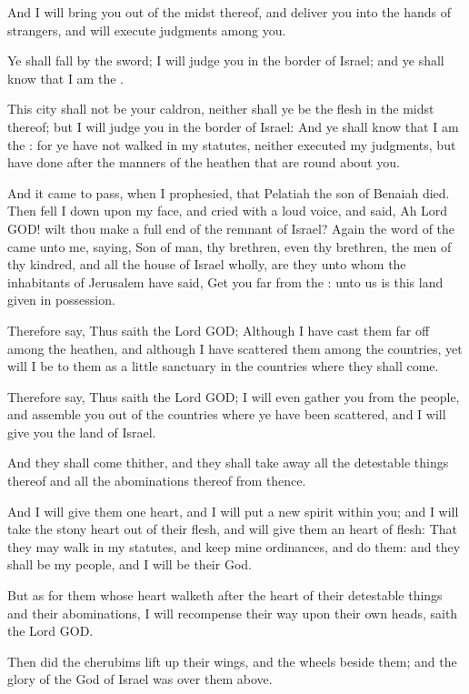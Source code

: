 \Verse And I will bring you out of the midst thereof, and deliver you into the hands of strangers, and will execute judgments among you.

\Verse Ye shall fall by the sword; I will judge you in the border of Israel; and ye shall know that I am the \LORD.

\Verse This city shall not be your caldron, neither shall ye be the flesh in the midst thereof; but I will judge you in the border of Israel: \Verse And ye shall know that I am the \LORD: for ye have not walked in my statutes, neither executed my judgments, but have done after the manners of the heathen that are round about you.

\Verse And it came to pass, when I prophesied, that Pelatiah the son of Benaiah died. Then fell I down upon my face, and cried with a loud voice, and said, Ah Lord GOD! wilt thou make a full end of the remnant of Israel?  \Verse Again the word of the \LORD came unto me, saying, \Verse Son of man, thy brethren, even thy brethren, the men of thy kindred, and all the house of Israel wholly, are they unto whom the inhabitants of Jerusalem have said, Get you far from the \LORD: unto us is this land given in possession.

\Verse Therefore say, Thus saith the Lord GOD; Although I have cast them far off among the heathen, and although I have scattered them among the countries, yet will I be to them as a little sanctuary in the countries where they shall come.

\Verse Therefore say, Thus saith the Lord GOD; I will even gather you from the people, and assemble you out of the countries where ye have been scattered, and I will give you the land of Israel.

\Verse And they shall come thither, and they shall take away all the detestable things thereof and all the abominations thereof from thence.

\Verse And I will give them one heart, and I will put a new spirit within you; and I will take the stony heart out of their flesh, and will give them an heart of flesh: \Verse That they may walk in my statutes, and keep mine ordinances, and do them: and they shall be my people, and I will be their God.

\Verse But as for them whose heart walketh after the heart of their detestable things and their abominations, I will recompense their way upon their own heads, saith the Lord GOD.

\Verse Then did the cherubims lift up their wings, and the wheels beside them; and the glory of the God of Israel was over them above.

